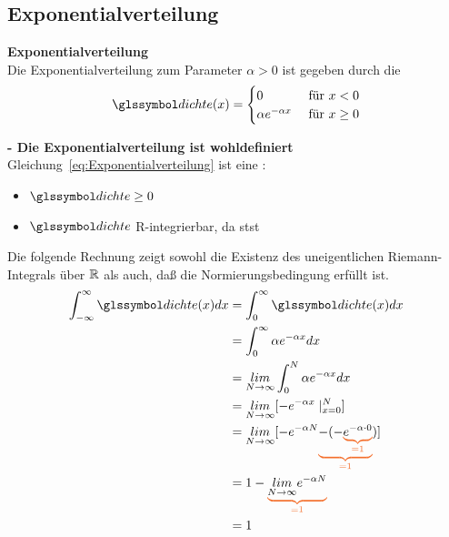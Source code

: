 \subsection{Exponentialverteilung}
\begin{defi}
    \textbf{Exponentialverteilung} \label{def:exponentialverteilung} \\
    Die Exponentialverteilung zum Parameter $\alpha > 0$ ist gegeben durch die \dichte
    \begin{equation}
        \label{eq:Exponentialverteilung}
        \dcht(x) = \begin{cases}
                       0 & \text{ für } x < 0 \\
                       \alpha e ^{- \alpha x} &  \text{ für } x \geq 0
        \end{cases}
    \end{equation}
\end{defi}
\begin{bem}
     \textbf{ - Die Exponentialverteilung ist wohldefiniert}   \\
    Gleichung~\ref{eq:Exponentialverteilung} ist eine \dichte:
    \begin{itemize}
        \item $\dcht  \geq 0 $
        \item $\dcht$ R-integrierbar, da \gls{stst}
    \end{itemize}
    Die folgende Rechnung zeigt sowohl die Existenz des uneigentlichen Riemann-
    Integrals über $\mathbb{R}$ als auch, daß die Normierungsbedingung erfüllt ist.
    \begin{align*}
        \int_{-\infty}^{\infty} \dcht(x) dx & =   \int_{0}^{\infty} \dcht(x) dx  \\
        & =   \int_{0}^{\infty} \alpha e^{-\alpha x} dx  \\
        & = \underset{N \rightarrow \infty}{lim} \int^N_0 \alpha e ^{-\alpha x} dx \\
        & = \underset{N \rightarrow \infty}{lim} [-e ^{-\alpha x} \mid^N_{x=0}] \\
        & = \underset{N \rightarrow \infty}{lim} [-e ^{-\alpha N}
        \txo{\underbrace{
            \textcolor{black}{- ( -\txo{\underbrace{
                \textcolor{black}{e^{-\alpha \cdot 0}
                }}_{=1}}}
        }_{=1}}
        )] \\
        & = 1 - \txo{
            \underbrace{
                \textcolor{black}{\underset{N \rightarrow \infty}{lim} e ^{- \alpha N}}
            }_{=1}
        } \\
        & = 1
    \end{align*}
\end{bem}




